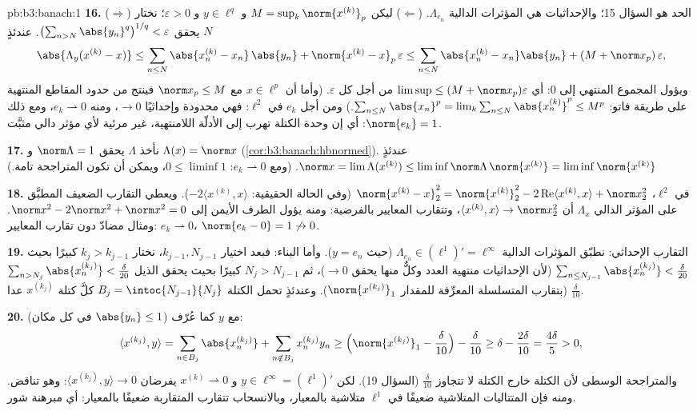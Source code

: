 \begin{solution}{pb:b3:banach:1}
\textbf{16.} ($\Rightarrow$) الحد هو السؤال 15؛ والإحداثيات هي
المؤثرات الدالية $\Lambda_{e_n}$. ($\Leftarrow$) ليكن $M = \sup_k\norm{x^{(k)}}_p$
و $y \in
\ell^q$ و $\varepsilon > 0$؛ نختار $N$ يحقق $\bigl(\sum_{n>N}\abs{y_n}^q\bigr)^{1/q} < \varepsilon$. عندئذٍ
\[
\abs{\Lambda_y(x^{(k)} - x)} \leq
\sum_{n\leq N}\abs{x^{(k)}_n - x_n}\,\abs{y_n} +
\norm{x^{(k)} - x}_p\,\varepsilon
\leq \sum_{n\leq N}\abs{x^{(k)}_n - x_n}\abs{y_n} +
(M + \norm x_p)\,\varepsilon,
\]
ويؤول المجموع المنتهي إلى $0$: أي $\limsup \leq (M + \norm
x_p)\varepsilon$ من أجل كل
$\varepsilon$. (وأما أن $x \in
\ell^p$ مع $\norm x_p \leq M$ فينتج من حدود
المقاطع المنتهية على طريقة فاتو: $\sum_{n \leq N}\abs{x_n}^p =
\lim_k\sum_{n\leq N}\abs{x^{(k)}_n}^p \leq M^p$.) ومن أجل $e_k$ في
$\ell^2$: فهي محدودة وإحداثيًا $\to 0$، ومنه $e_k
\rightharpoonup 0$،
ومع ذلك $\norm{e_k} = 1$: أي إن وحدة الكتلة تهرب إلى الأدلّة
اللامنتهية، غير مرئية لأي مؤثر دالي مثبَّت.

\textbf{17.} نأخذ $\Lambda$ يحقق $\norm\Lambda = 1$ و $\Lambda(x) = \norm x$
(\cref{cor:b3:banach:hbnormed}). عندئذٍ $\norm x = \lim\Lambda(x^{(k)}) \leq
\liminf\norm\Lambda\,\norm{x^{(k)}} =
\liminf\norm{x^{(k)}}$. (ومع $e_k \rightharpoonup 0$: $0
\leq \liminf 1$، ويمكن
أن تكون المتراجحة تامة.)

\textbf{18.} في $\ell^2$، $\norm{x^{(k)} - x}_2^2 =
\norm{x^{(k)}}_2^2 - 2\operatorname{Re}\langle x^{(k)},
x\rangle + \norm x_2^2$ (وفي الحالة الحقيقية:
$-2\langle x^{(k)},
x\rangle$). ويعطي التقارب الضعيف المطبَّق على المؤثر الدالي
$\Lambda_x$ أن $\langle x^{(k)}, x\rangle \to \norm
x_2^2$، وتتقارب المعايير بالفرضية: ومنه يؤول
الطرف الأيمن إلى $\norm x^2 - 2\norm x^2 + \norm x^2 = 0$. ومثال مضادّ دون تقارب المعايير:
$e_k
\rightharpoonup 0$، $\norm{e_k - 0} = 1 \not\to 0$.

\textbf{19.} التقارب الإحداثي: نطبّق المؤثرات الدالية $\Lambda_{e_n} \in (\ell^1)' = \ell^\infty$
(حيث $y = e_n$). وأما البناء: فبعد اختيار $k_{j-1}, N_{j-1}$، نختار $k_j >
k_{j-1}$
كبيرًا بحيث $\sum_{n \leq
N_{j-1}}\abs{x^{(k_j)}_n} < \frac\delta{20}$ (لأن الإحداثيات منتهية العدد وكلٌّ منها يحقق $\to 0$)، ثم $N_j > N_{j-1}$ كبيرًا بحيث يحقق الذيل $\sum_{n > N_j}\abs{x^{(k_j)}_n} <
\frac\delta{20}$
(بتقارب المتسلسلة المعرِّفة للمقدار $\norm{x^{(k_j)}}_1$). وعندئذٍ تحمل
الكتلة $B_j = \intoc{N_{j-1}}{N_j}$ كلَّ كتلة $x^{(k_j)}$ عدا $\frac\delta{10}$.

\textbf{20.} مع $y$ كما عُرّف ($\abs{y_n} \leq 1$ في كل مكان):
\[
\langle x^{(k_j)}, y\rangle
= \sum_{n \in B_j}\abs{x^{(k_j)}_n}
+ \sum_{n \notin B_j}x^{(k_j)}_ny_n
\geq \Bigl(\norm{x^{(k_j)}}_1 - \frac\delta{10}\Bigr) -
\frac\delta{10}
\geq \delta - \frac{2\delta}{10} = \frac{4\delta}5 > 0,
\]
والمتراجحة الوسطى لأن الكتلة خارج الكتلة لا تتجاوز $\frac\delta{10}$
(السؤال 19). لكن $y \in
\ell^\infty = (\ell^1)'$ و $x^{(k)} \rightharpoonup 0$ يفرضان $\langle x^{(k_j)}, y\rangle \to 0$: وهو تناقض.
ومنه فإن المتتاليات المتلاشية ضعيفًا في $\ell^1$ متلاشية
بالمعيار، وبالانسحاب تتقارب المتقاربة ضعيفًا بالمعيار: أي مبرهنة
شور.


\end{solution}
